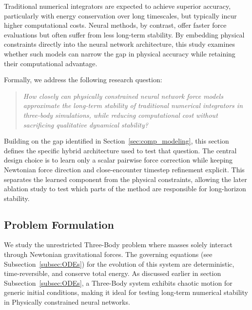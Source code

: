 \documentclass[12pt]{article}
\begin{document}
Traditional numerical integrators are expected to achieve superior accuracy, particularly with energy conservation over long timescales, but typically incur higher computational costs. Neural methods, by contrast, offer faster force evaluations but often suffer from less long-term stability. By embedding physical constraints directly into the neural network architecture, this study examines whether such models can narrow the gap in physical accuracy while retaining their computational advantage.

Formally, we address the following research question:
\begin{quote}
\emph{How closely can physically constrained neural network force models approximate the long-term stability of traditional numerical integrators in three-body simulations, while reducing computational cost without sacrificing qualitative dynamical stability?}
\end{quote}

Building on the gap identified in Section~\ref{sec:comp_modeling}, this section defines the specific hybrid architecture used to test that question. The central design choice is to learn only a scalar pairwise force correction while keeping Newtonian force direction and close-encounter timestep refinement explicit. This separates the learned component from the physical constraints, allowing the later ablation study to test which parts of the method are responsible for long-horizon stability.

\subsection{Problem Formulation}
We study the unrestricted Three-Body problem where masses solely interact through Newtonian gravitational forces. The governing equations (see Subsection~\ref{subsec:ODEs}) for the evolution of this system are deterministic, time-reversible, and conserve total energy. As discussed earlier in section Subsection~\ref{subsec:ODEs}, a Three-Body system exhibits chaotic motion for generic initial conditions, making it ideal for testing long-term numerical stability in Physically constrained neural networks.
\end{document}

